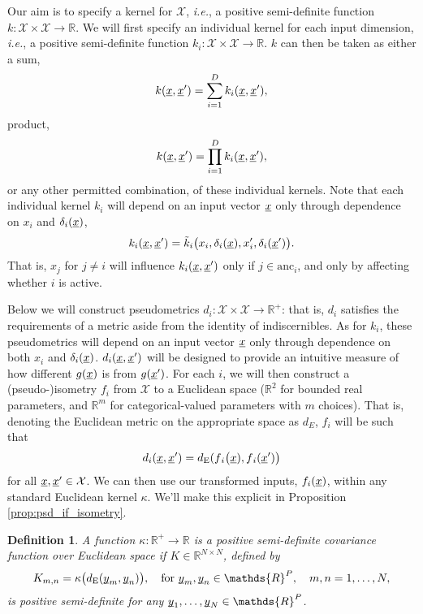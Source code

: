 \documentclass[letterpaper]{article}
\newcommand{\vect}[1]{\underline{\smash{#1}}}
\renewcommand{\v}[1]{\vect{#1}}
\newcommand{\reals}{\mathds{R}}
\newcommand{\sX}{\mathcal{X}}
\newtheorem{define}[thm]{Definition}
\begin{document}
Our aim is to specify a kernel for $\sX$, \emph{i.e.}, a positive semi-definite function  $k\colon \sX \times \sX \to \reals$. We will first specify an individual kernel for each input dimension, \emph{i.e.}, a positive semi-definite function $k_i\colon \sX \times \sX \to \reals$. $k$ can then be taken as either a sum,
\begin{equation}
 k(\v{x}, \v{x}') = \sum_{i=1}^D k_i(\v{x},\v{x}'),
\end{equation}
product,
\begin{equation}
 k(\v{x}, \v{x}') = \prod_{i=1}^D k_i(\v{x},\v{x}'),
\end{equation}
or any other permitted combination, of these individual kernels. Note that each individual kernel $k_i$ will depend on an input vector $\v{x}$ only through dependence on $x_i$ and $\delta_i(\v{x})$,
\begin{equation}
  k_i(\v{x},\v{x}') = \tilde{k}_i\bigl(x_i,\delta_i(\v{x}),x_i', \delta_i(\v{x}') \bigr).
\end{equation}
That is, $x_j$ for $j\neq i$ will influence $k_i(\v{x},\v{x}')$ only if $j \in \text{anc}_i$, and only by affecting whether $i$ is active.

Below we will construct pseudometrics $d{_i}\colon \sX \times \sX \to \reals^+$: that is, $d_i$ satisfies the requirements of a metric aside from the identity of indiscernibles. As for $k_i$, these pseudometrics will depend on an input vector $\v{x}$ only through dependence on both $x_i$ and $\delta_i(\v{x})$. $d{_i}(\v{x}, \v{x}')$ will be designed to provide an intuitive measure of how different $g(\v{x})$ is from $g(\v{x}')$. 
For each $i$, we will then construct a (pseudo-)isometry $f_i$ from
$\sX$ 
to a Euclidean space ($\reals^2$ for bounded real parameters, and $\reals^m$ for categorical-valued parameters with $m$ choices). That is, denoting the Euclidean metric on the appropriate space as $d{_E}$, $f_i$ will be such that
\begin{equation}
\label{eqn:d_i}
 d{_i}(\v{x},\v{x}')
=
d_{\text{E}}(f{_i}\bigl(\v{x}), f{_i}(\v{x}')\bigr)
\end{equation}
for all $\v{x}, \v{x}' \in \sX$. We can then use our transformed inputs, $f_i(\v{x})$, within any standard Euclidean kernel $\kappa$. We'll make this explicit in Proposition \ref{prop:psd_if_isometry}. 

\begin{define}
\label{def:psd_fun_euclid}
A function $\kappa\colon \reals^+ \to \reals$ is \emph{a positive semi-definite covariance function over Euclidean space} if $K \in \reals^{N\times N}$, defined by 
\begin{equation}
\nonumber K_{m, n} = \kappa\bigl(d_{\text{E}}(\v{y}_m, \v{y}_n)\bigr),\quad \text{for }
\v{y}_m, \v{y}_n \in \reals^P,\quad m, n = 1, \ldots, N, 
\end{equation}
is positive semi-definite for any $\v{y}_1, \dots, \v{y}_N \in \reals^P$. 
\end{define}
\end{document}

